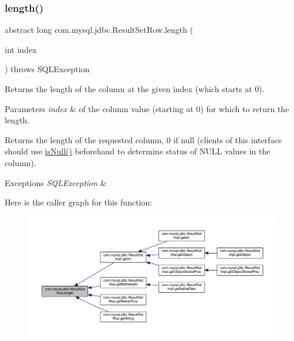 \subsubsection{\texorpdfstring{length()}{length()}}
{\footnotesize\ttfamily abstract long com.\+mysql.\+jdbc.\+Result\+Set\+Row.\+length (\begin{DoxyParamCaption}\item[{int}]{index }\end{DoxyParamCaption}) throws S\+Q\+L\+Exception\hspace{0.3cm}{\ttfamily [abstract]}}

Returns the length of the column at the given index (which starts at 0).


\begin{DoxyParams}{Parameters}
{\em index} & of the column value (starting at 0) for which to return the length. \\
\hline
\end{DoxyParams}
\begin{DoxyReturn}{Returns}
the length of the requested column, 0 if null (clients of this interface should use \mbox{\hyperlink{classcom_1_1mysql_1_1jdbc_1_1_result_set_row_a96243f8e7eb839c4c233a2e4aa1cfb6b}{is\+Null()}} beforehand to determine status of N\+U\+LL values in the column).
\end{DoxyReturn}

\begin{DoxyExceptions}{Exceptions}
{\em S\+Q\+L\+Exception} & \\
\hline
\end{DoxyExceptions}
Here is the caller graph for this function\+:
\nopagebreak
\begin{figure}[H]
\begin{center}
\leavevmode
\includegraphics[width=350pt]{classcom_1_1mysql_1_1jdbc_1_1_result_set_row_a7d2e1a3d54533e0655afdc0a411808ed_icgraph}
\end{center}
\end{figure}
\mbox{\label{classcom_1_1mysql_1_1jdbc_1_1_result_set_row_a39c9cab871e6878715135801daa3b09d}} 
